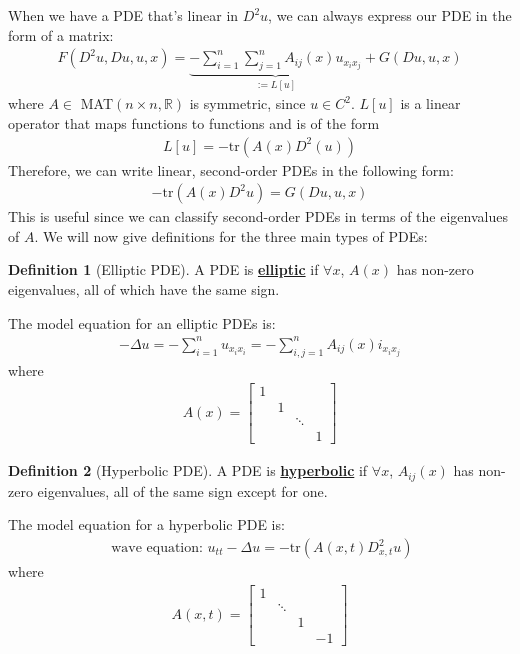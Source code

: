 \documentclass[11pt]{scrartcl}
\theoremstyle{definition}
\newtheorem{definition}{Definition}
\theoremstyle{remark}
\newcommand{\dfn}[1]{\textbf{\underline{#1}}}
\newcommand{\R}[0]{\mathbb{R}}
\begin{document}
When we have a PDE that's linear in $D^2u$, we can always express our PDE in the form of a matrix: 
\begin{align}
	F(D^2u, Du, u, x) = \underbrace{- \sum_{i=1}^n \sum_{j=1}^n A_{ij}(x) u_{x_ix_j}}_{:=L[u]}  + G(Du, u, x) 
\end{align}
where $A \in $ MAT$(n \times n, \R)$ is symmetric, since $u \in C^2$. $L[u]$ is a linear operator that maps functions to functions and is of the form
\begin{align}
	L[u] = -\text{tr}( A(x) D^2(u)) 	
\end{align}
Therefore, we can write linear, second-order PDEs in the following form: 
\begin{align}
	-\text{tr}(A(x) D^2 u) = G(Du, u,x) 	
\end{align}
This is useful since we can classify second-order PDEs in terms of the eigenvalues of $A$. We will now give definitions for the three main types of PDEs: 

\begin{definition}[Elliptic PDE]
	A PDE is \dfn{elliptic} if $\forall x$, $A(x)$ has non-zero eigenvalues, all of which have the same sign. 
\end{definition}

The model equation for an elliptic PDEs is: 
\begin{align}
	- \Delta u = -\sum_{i=1}^n u_{x_i x_i} = - \sum_{i,j =1}^n A_{ij}(x) i_{x_i x_j} 	
\end{align}
where 
\begin{align}
	A(x) = \begin{bmatrix}
		1 &  &  & \\
		  & 1 & & \\
		  &  &  \ddots & \\
		  & & & 1 
	\end{bmatrix}	
\end{align}

\begin{definition}[Hyperbolic PDE]
	A PDE is \dfn{hyperbolic} if $\forall x$, $A_{ij}(x)$ has non-zero eigenvalues, all of the same sign except for one. 
\end{definition}

The model equation for a hyperbolic PDE is: 
\begin{align}
	\text{ wave equation: } u_{tt} - \Delta u = - \text{tr} (A(x,t) D_{x,t}^2 u ) 	
\end{align}
where 
\begin{align}
	A(x,t) = 	\begin{bmatrix}
		1 &  &  & \\
		  & \ddots & & \\
		  &  &  1 & \\
		  & & & -1
	\end{bmatrix}	
\end{align}
\end{document}
